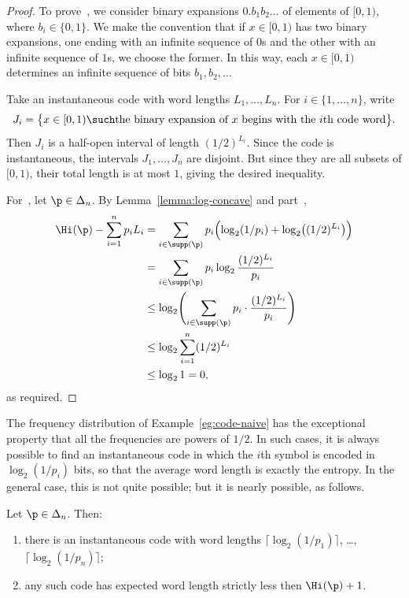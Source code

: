 \begin{proof}
To prove~, we consider binary expansions $0.b_1
b_2 \ldots$ of elements of $[0, 1)$, where $b_i \in \{0, 1\}$.  We make the
convention that if $x \in [0, 1)$ has two binary expansions, one ending
with an infinite sequence of $0$s and the other with an infinite
sequence of $1$s, we choose the former.  In this way, each $x \in [0,
1)$ determines an infinite sequence of bits $b_1, b_2, \ldots$

Take an instantaneous code with word lengths $L_1, \ldots, L_n$.
For $i \in \{1, \ldots, n\}$, write 
\[
J_i 
=
\bigl\{ x \in [0, 1) \such \text{the binary expansion of } x
\text{ begins with the $i$th code word} \bigr\}.
\]
Then $J_i$ is a half-open interval of length $(1/2)^{L_i}$.  Since the code
is instantaneous, the intervals $J_1, \ldots, J_n$ are disjoint.  But since
they are all subsets of $[0, 1)$, their total length is at most $1$, giving
the desired inequality.

For~, let $\p \in \Delta_n$.  By
Lemma~\ref{lemma:log-concave} and part~, 
% 
\begin{align*}
\Hi(\p) - \sum_{i = 1}^n p_i L_i        &
=
\sum_{i \in \supp(\p)} p_i
\Bigl( \log_2 (1/p_i)
+ \log_2 \bigl((1/2)^{L_i} \bigr) \Bigr)   \\
&
=
\sum_{i \in \supp(\p)} 
p_i \log_2 \frac{(1/2)^{L_i}}{p_i}      \\
&
\leq
\log_2 \Biggl( 
\sum_{i \in \supp(\p)} p_i \cdot \frac{(1/2)^{L_i}}{p_i} 
\Biggr) \\
&
\leq
\log_2 \sum_{i = 1}^n (1/2)^{L_i}  \\
& 
\leq 
\log_2 1 = 0,
\end{align*}
% 
as required.
\end{proof}

The frequency distribution of Example~\ref{eg:code-naive} has the
exceptional property that all the frequencies are powers of $1/2$.
In such cases, it is always possible to find an instantaneous code in which
the $i$th symbol is encoded in $\log_2(1/p_i)$ bits, so that the average
word length is exactly the entropy.  In the general case, this is not quite
possible; but it is nearly possible, as follows.

\begin{propn}
Let $\p \in \Delta_n$.  Then:
% 
\begin{enumerate}
\item 
{}
there is an instantaneous code with word lengths $\lceil \log_2(1/p_1)
\rceil$, \ldots, $\lceil \log_2(1/p_n) \rceil$;

\item
{}
any such code has expected word length strictly less then
$\Hi(\p) + 1$.  
\end{enumerate}
\end{propn}

